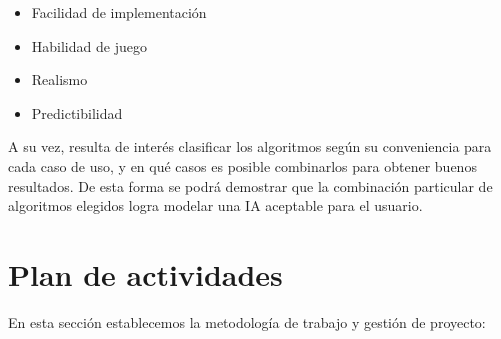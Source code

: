 \documentclass[a4paper]{article}
\begin{document}
\begin{itemize}
    \item Facilidad de implementación
    \item Habilidad de juego
    \item Realismo
    \item Predictibilidad
\end{itemize}

A su vez, resulta de interés clasificar los algoritmos según su conveniencia para cada caso de uso, y en qué casos es posible combinarlos para obtener buenos resultados. De esta forma se podrá demostrar que la combinación particular de algoritmos elegidos logra modelar una IA aceptable para el usuario.

\section{Plan de actividades}

En esta sección establecemos la metodología de trabajo y gestión de proyecto:
\end{document}
